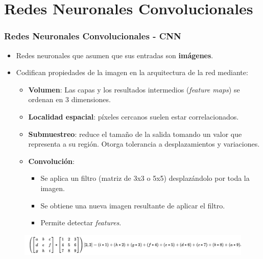\documentclass[10pt,center]{beamer}
\begin{document}
\section{Redes Neuronales Convolucionales}
\begin{frame}
  \frametitle{Redes Neuronales Convolucionales - CNN}
    \begin{itemize}
      \item Redes neuronales que asumen que sus entradas son \textbf{imágenes}.
      \item Codifican propiedades de la imagen en la arquitectura de la red mediante:
      \begin{itemize}
	\item \textbf{Volumen}: Las capas y los resultados intermedios (\textit{feature maps}) se ordenan en 3 dimensiones.
	\item \textbf{Localidad espacial}: píxeles cercanos suelen estar correlacionados.
	\item \textbf{Submuestreo}: reduce el tamaño de la salida tomando un valor que representa a su región. 
	Otorga tolerancia a desplazamientos y variaciones.
	\item \textbf{Convolución}:
	  \begin{itemize}
	    \item Se aplica un filtro (matriz de 3x3 o 5x5) desplazándolo por toda la imagen.
	    \item Se obtiene una nueva imagen resultante de aplicar el filtro.
	    \item Permite detectar \textit{features}. 
	  \end{itemize}
      \end{itemize}
    \end{itemize}
    \begin{figure}[h]
      \begin{center}
      \includegraphics[width=\textwidth]{./img/convolution_wiki.jpg}
      \end{center}
    \end{figure}
\end{frame}
  
\end{document}
